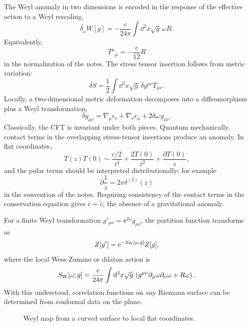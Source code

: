 The Weyl anomaly in two dimensions is encoded in the response of the
effective action to a Weyl rescaling,
\[
  \delta_\omega W[g]=-\frac c{24\pi}\int \dd^2x\sqrt g\,\omega R.
\]
Equivalently,
\[
  T^\mu{}_\mu=-\frac c{12}R
\]
in the normalization of the notes.
The stress tensor insertion follows from metric variation:
\[
  \delta S
  =
  \frac12\int\dd^2x\sqrt g\,\delta g^{\mu\nu}T_{\mu\nu}.
\]
Locally, a two-dimensional metric deformation decomposes into a
diffeomorphism plus a Weyl transformation,
\[
  \delta g_{\mu\nu}
  =
  \nabla_\mu\epsilon_\nu+\nabla_\nu\epsilon_\mu
  +2\delta\omega\,g_{\mu\nu}.
\]
Classically, the CFT is invariant under both pieces.  Quantum
mechanically, contact terms in the overlapping stress-tensor insertions
produce an anomaly.  In flat coordinates,
\[
  T(z)T(0)
  \sim
  \frac{c/2}{z^4}
  +\frac{2T(0)}{z^2}
  +\frac{\partial T(0)}{z},
\]
and the polar terms should be interpreted distributionally; for example
\[
  \bar\partial\frac1z=2\pi\delta^{(2)}(z)
\]
in the convention of the notes.  Requiring consistency of the contact
terms in the conservation equation gives \(c=\widetilde c\), the
absence of a gravitational anomaly.

For a finite Weyl transformation \(g'_{\mu\nu}=\ee^{2\omega}g_{\mu\nu}\),
the partition function transforms as
\[
  Z[g']=\mathrm{e}^{-S_{\rm W}[\omega;g]}Z[g],
\]
where the local Wess-Zumino or dilaton action is
\[
  S_{\rm W}[\omega;g]
  =
  \frac c{24\pi}
  \int\mathrm{d}^2x\sqrt g\,
  \left(g^{\mu\nu}\partial_\mu\omega\partial_\nu\omega+R\omega\right).
\]
With this understood, correlation functions on any Riemann surface can
be determined from conformal data on the plane.

\begin{figure}[htbp]
\centering
{}
\caption{Weyl map from a curved surface to local flat coordinates.}
\end{figure}

